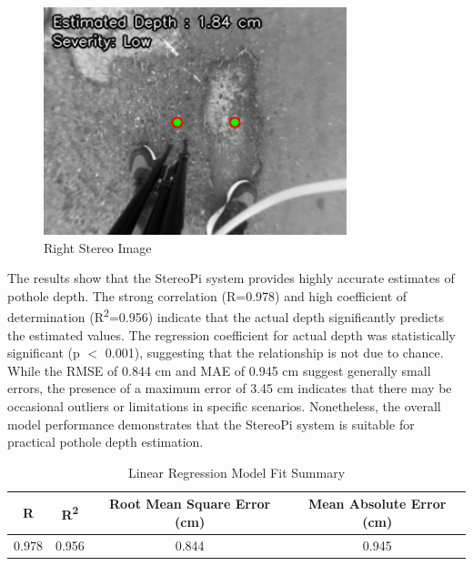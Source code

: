 \begin{figure}[htbp]
\begin{minipage}{0.32\textwidth}
		\includegraphics[width=\textwidth]{pothole raw right.png}
		\caption{Right Stereo Image}
		\label{fig:image3}
	\end{minipage}
\end{figure}


The results show that the StereoPi system provides highly accurate estimates of pothole depth. The strong correlation (R=0.978) and high coefficient of determination (R\textsuperscript{2}=0.956) indicate that the actual depth significantly predicts the estimated values. The regression coefficient for actual depth was statistically significant (p $<$ 0.001), suggesting that the relationship is not due to chance. While the RMSE of 0.844 cm and MAE of 0.945 cm suggest generally small errors, the presence of a maximum error of 3.45 cm indicates that there may be occasional outliers or limitations in specific scenarios. Nonetheless, the overall model performance demonstrates that the StereoPi system is suitable for practical pothole depth estimation.

\begin{table}[H]
	\centering
	\begin{tabular}{|c|c|c|c|}
		\hline
		\textbf{R} & \textbf{R\textsuperscript{2}} & \textbf{Root Mean Square Error (cm)} & \textbf{Mean Absolute Error (cm)} \\
		\hline
		0.978 & 0.956 & 0.844 & 0.945 \\
		\hline
	\end{tabular}
	\caption{Linear Regression Model Fit Summary}
	\label{tab:model_fit}
\end{table}

